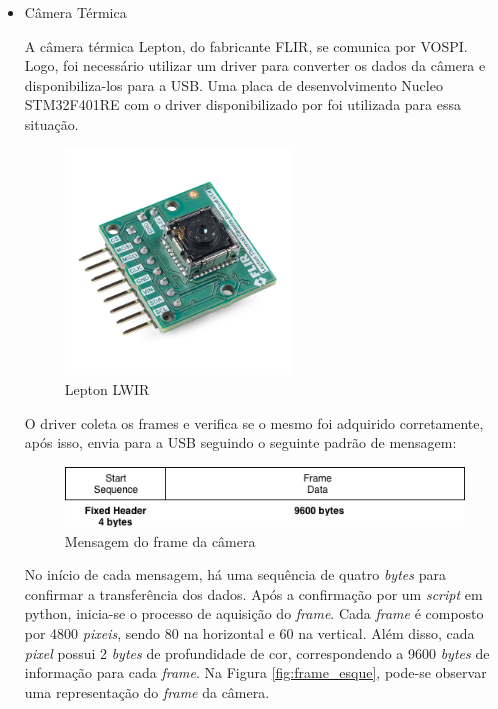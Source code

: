 	\begin{itemize}
		\item Câmera Térmica
		
		A câmera térmica Lepton, do fabricante FLIR, se comunica por VOSPI. Logo, foi necessário utilizar um driver para converter os dados da câmera e disponibiliza-los para a USB. Uma placa de desenvolvimento Nucleo STM32F401RE com o driver disponibilizado por  foi utilizada para essa situação.
		
		\begin{figure}[!ht]
			\centering
			\includegraphics[width=6cm]{Figures/lepton_flir.jpg}
			\caption{Lepton LWIR}
			\label{fig:lepton}
		\end{figure}
		
		O driver coleta os frames e verifica se o mesmo foi adquirido corretamente, após isso, envia para a USB seguindo o seguinte padrão de mensagem:
		
		\begin{figure}[!ht]
			\centering
			\includegraphics[width=14cm]{Figures/frame_msg.png}
			\caption{Mensagem do frame da câmera}
			\label{fig:framemsg}
		\end{figure}
		
		No início de cada mensagem, há uma sequência de quatro \textit{bytes} para confirmar a transferência dos dados. Após a confirmação por um \textit{script} em python, inicia-se o processo de aquisição do \textit{frame}. Cada \textit{frame} é composto por 4800 \textit{pixeis}, sendo 80 na horizontal e 60 na vertical. Além disso, cada \textit{pixel} possui 2 \textit{bytes} de profundidade de cor, correspondendo a 9600 \textit{bytes} de informação para cada \textit{frame}. Na Figura \ref{fig:frame_esque}, pode-se observar uma representação do \textit{frame} da câmera.
		

\end{itemize}
